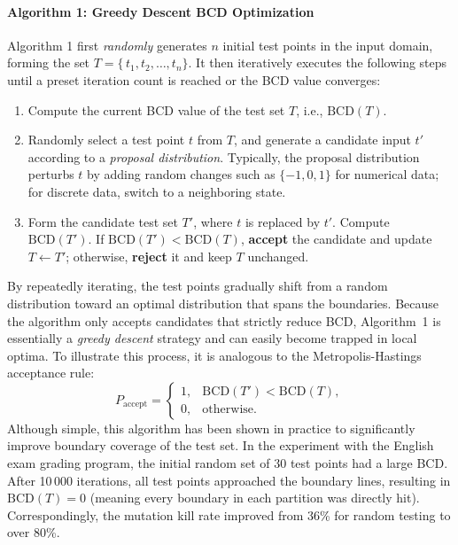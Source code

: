 \documentclass[manuscript,screen,review]{acmart}
\begin{document}
\paragraph{Algorithm 1: Greedy Descent BCD Optimization}  
Algorithm 1 first \emph{randomly} generates $n$ initial test points in the input domain, forming the set $T = \{\, t_1, t_2, \ldots, t_n \}$. It then iteratively executes the following steps until a preset iteration count is reached or the BCD value converges:
\begin{enumerate}
  \item Compute the current BCD value of the test set $T$, i.e., $\mathrm{BCD}(T)$.
  \item Randomly select a test point $t$ from $T$, and generate a candidate input $t'$ according to a \emph{proposal distribution}. Typically, the proposal distribution perturbs $t$ by adding random changes such as $\{-1, 0, 1\}$ for numerical data; for discrete data, switch to a neighboring state.
  \item Form the candidate test set $T'$, where $t$ is replaced by $t'$. Compute $\mathrm{BCD}(T')$. If $\mathrm{BCD}(T') < \mathrm{BCD}(T)$, \textbf{accept} the candidate and update $T \leftarrow T'$; otherwise, \textbf{reject} it and keep $T$ unchanged.
\end{enumerate}
By repeatedly iterating, the test points gradually shift from a random distribution toward an optimal distribution that spans the boundaries. Because the algorithm only accepts candidates that strictly reduce BCD, Algorithm~1 is essentially a \emph{greedy descent} strategy and can easily become trapped in local optima. To illustrate this process, it is analogous to the Metropolis-Hastings acceptance rule:
\[
P_{\mathrm{accept}} =
\begin{cases}
1, & \mathrm{BCD}(T') < \mathrm{BCD}(T), \\
0, & \text{otherwise}.
\end{cases}
\]
Although simple, this algorithm has been shown in practice to significantly improve boundary coverage of the test set. In the experiment with the English exam grading program, the initial random set of 30 test points had a large BCD. After 10\,000 iterations, all test points approached the boundary lines, resulting in $\mathrm{BCD}(T) = 0$ (meaning every boundary in each partition was directly hit). Correspondingly, the mutation kill rate improved from 36\% for random testing to over 80\%.
\end{document}
